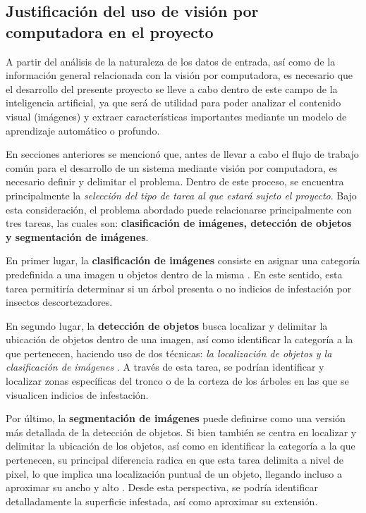 \subsection{Justificación del uso de visión por computadora en el proyecto}

A partir del análisis de la naturaleza de los datos de entrada, así como de la información general relacionada con la visión por computadora, es necesario que el desarrollo del presente proyecto se lleve a cabo dentro de este campo de la inteligencia artificial, ya que será de utilidad para poder analizar el contenido visual (imágenes) y extraer características importantes mediante un modelo de aprendizaje automático o profundo. 

En secciones anteriores se mencionó que, antes de llevar a cabo el flujo de trabajo común para el desarrollo de un sistema mediante visión por computadora, es necesario definir y delimitar el problema. Dentro de este proceso, se encuentra principalmente la \textit{selección del tipo de tarea al que estará sujeto el proyecto}. Bajo esta consideración, el problema abordado puede relacionarse principalmente con tres tareas, las cuales son: \textbf{clasificación de imágenes, detección de objetos y segmentación de imágenes}. 

En primer lugar, la \textbf{clasificación de imágenes} consiste en asignar una categoría predefinida a una imagen u objetos dentro de la misma \cite{ibm_computer_vision}. En este sentido, esta tarea permitiría determinar si un árbol presenta o no indicios de infestación por insectos descortezadores.

En segundo lugar, la \textbf{detección de objetos} busca localizar y delimitar la ubicación de objetos dentro de una imagen, así como identificar la categoría a la que pertenecen, haciendo uso de dos técnicas: \textit{la localización de objetos y la clasificación de imágenes }\cite{ibm_computer_vision}. A través de esta tarea, se podrían identificar y localizar zonas específicas del tronco o de la corteza de los árboles en las que se visualicen indicios de infestación.

Por último, la \textbf{segmentación de imágenes} puede definirse como una versión más detallada de la detección de objetos. Si bien también se centra en localizar y delimitar la ubicación de los objetos, así como en identificar la categoría a la que pertenecen, su principal diferencia radica en que esta tarea delimita a nivel de pixel, lo que implica una localización puntual de un objeto, llegando incluso a aproximar su ancho y alto \cite{ibm_computer_vision}. Desde esta perspectiva, se podría identificar detalladamente la superficie infestada, así como aproximar su extensión.

